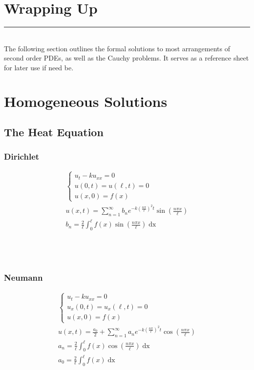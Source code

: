 \section{Wrapping Up}
\hrule
\noindent\\
\indent The following section outlines the formal solutions to most arrangements of second order PDEs,
as well as the Cauchy problems. It serves as a reference sheet for later use if need be.
\section*{Homogeneous Solutions}
\subsection{The Heat Equation}
\begin{minipage}{0.5\textwidth}
\subsubsection*{Dirichlet}
\begin{gather*}
\begin{cases}
u_{t} - ku_{xx} = 0\\
u(0,t) = u(\ell,t) = 0\\
u(x,0) = f(x)
\end{cases}\\
u(x,t) = \sum_{n=1}^{\infty}b_{n}e^{-k\left(\frac{n\pi}{\ell}\right)^{2}t}\sin{\left(\frac{n\pi
x}{\ell}\right)}\\
b_{n} = \frac{2}{\ell}\int_{0}^{\ell}f(x)\sin{\left(\frac{n\pi x}{\ell}\right)}\mathop{dx}
\end{gather*}
\noindent\\\\\\
\end{minipage}
\begin{minipage}{0.5\textwidth}
\subsubsection*{Neumann}
\begin{gather*}
\begin{cases}
u_{t} - ku_{xx} = 0\\
u_{x}(0,t) = u_{x}(\ell,t) = 0\\
u(x,0) = f(x)
\end{cases}\\
u(x,t) = \frac{a_{0}}{2} +
\sum_{n=1}^{\infty}a_{n}e^{-k\left(\frac{n\pi}{\ell}\right)^{2}t}\cos{\left(\frac{n\pi x}{\ell}\right)}\\
a_{n} = \frac{2}{\ell}\int_{0}^{\ell}f(x)\cos{\left(\frac{n\pi x}{\ell}\right)}\mathop{dx}\\
a_{0} = \frac{2}{\ell}\int_{0}^{\ell}f(x)\mathop{dx}\\
\end{gather*}
\end{minipage}


